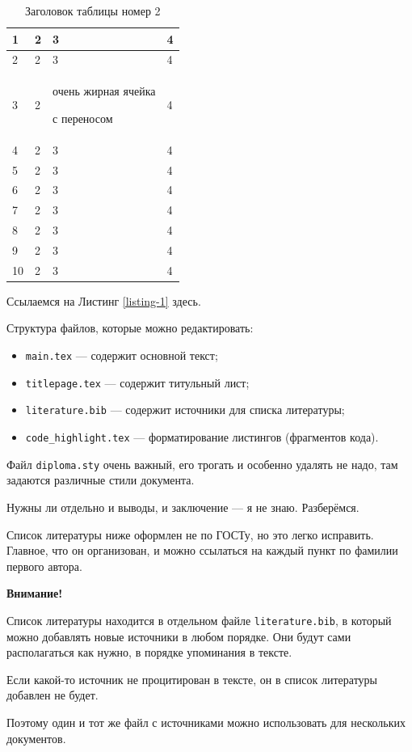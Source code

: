 \documentclass[a4paper,14pt]{extarticle}
\begin{document}
\begin{center}
    \begin{longtable}{|p{2cm}||p{3cm}|p{7cm}|p{3cm}|}
    \caption{Заголовок таблицы номер 2}\\
    \hline
    1 & 2 & 3 & 4\\ 
    \hline
    2 & 2 & 3 & 4\\
    \hline
    3 & 2 & очень жирная ячейка \par с переносом & 4\\
    \hline
    4 & 2 & 3 & 4\\
    \hline
    5 & 2 & 3 & 4\\
    \hline
    6 & 2 & 3 & 4\\
    \hline
    7 & 2 & 3 & 4\\
    \hline
    8 & 2 & 3 & 4\\
    \hline
    9 & 2 & 3 & 4\\
    \hline
    10 & 2 & 3 & 4\\
    \hline
    
    
    \end{longtable}
\end{center}

Ссылаемся на Листинг \ref{listing-1} здесь.

\pagebreak
{}
Структура файлов, которые можно редактировать:

\begin{itemize}
    \item \verb|main.tex| --- содержит основной текст;
    \item \verb|titlepage.tex| --- содержит титульный лист;
    \item \verb|literature.bib| --- содержит источники для списка литературы;
    \item \verb|code_highlight.tex| --- форматирование листингов (фрагментов кода).
\end{itemize}

Файл \verb|diploma.sty| очень важный, его трогать и особенно удалять не надо, там задаются различные стили документа.

Нужны ли отдельно и выводы, и заключение --- я не знаю. Разберёмся.

Список литературы ниже оформлен не по ГОСТу, но это легко исправить. Главное, что он организован, и можно ссылаться на каждый пункт по фамилии первого автора.

\textbf{Внимание!} 

Список литературы находится в отдельном файле \verb|literature.bib|, в который можно добавлять новые источники в любом порядке. Они будут сами располагаться как нужно, в порядке упоминания в тексте.

Если какой-то источник не процитирован в тексте, он в список литературы добавлен не будет.

Поэтому один и тот же файл с источниками можно использовать для нескольких документов.

\printbibliography
\end{document}
